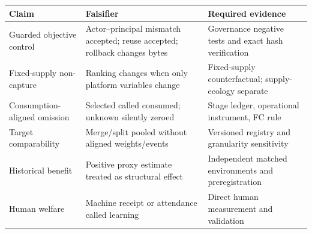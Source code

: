 \documentclass[
  11pt]{article}
\begin{document}
\begin{longtable}[]{@{}
  >{\raggedright\arraybackslash}p{}
  >{\raggedright\arraybackslash}p{}
  >{\raggedright\arraybackslash}p{}@{}}
\toprule\noalign{}
\begin{minipage}[b]{\linewidth}\raggedright
Claim
\end{minipage} & \begin{minipage}[b]{\linewidth}\raggedright
Falsifier
\end{minipage} & \begin{minipage}[b]{\linewidth}\raggedright
Required evidence
\end{minipage} \\
\midrule\noalign{}
\endhead
\bottomrule\noalign{}
\endlastfoot
Guarded objective control & Actor--principal mismatch accepted; reuse
accepted; rollback changes bytes & Governance negative tests and exact
hash verification \\
Fixed-supply non-capture & Ranking changes when only platform variables
change & Fixed-supply counterfactual; supply-ecology separate \\
Consumption-aligned omission & Selected called consumed; unknown
silently zeroed & Stage ledger, operational instrument, FC rule \\
Target comparability & Merge/split pooled without aligned weights/events
& Versioned registry and granularity sensitivity \\
Historical benefit & Positive proxy estimate treated as structural
effect & Independent matched environments and preregistration \\
Human welfare & Machine receipt or attendance called learning & Direct
human measurement and validation \\
\end{longtable}
\end{document}
